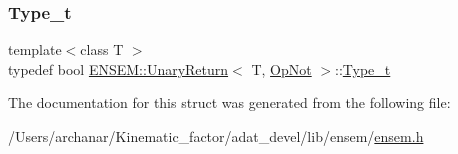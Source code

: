 \subsubsection{\texorpdfstring{Type\_t}{Type\_t}\hspace{0.1cm}{\footnotesize\ttfamily [2/2]}}
{\footnotesize\ttfamily template$<$class T $>$ \\
typedef bool \mbox{\hyperlink{structENSEM_1_1UnaryReturn}{E\+N\+S\+E\+M\+::\+Unary\+Return}}$<$ T, \mbox{\hyperlink{structENSEM_1_1OpNot}{Op\+Not}} $>$\+::\mbox{\hyperlink{structENSEM_1_1UnaryReturn_3_01T_00_01OpNot_01_4_ac8f0fccccf6b1d70cd924f95199cf9b4}{Type\+\_\+t}}}



The documentation for this struct was generated from the following file\+:\begin{DoxyCompactItemize}
\item 
/\+Users/archanar/\+Kinematic\+\_\+factor/adat\+\_\+devel/lib/ensem/\mbox{\hyperlink{lib_2ensem_2ensem_8h}{ensem.\+h}}\end{DoxyCompactItemize}
